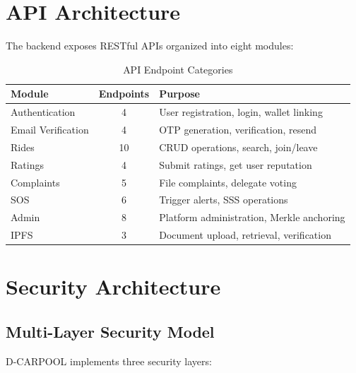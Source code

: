 \documentclass[12pt]{report}
\theoremstyle{plain}
\theoremstyle{definition}
\theoremstyle{remark}
\begin{document}
\section{API Architecture}

The backend exposes RESTful APIs organized into eight modules:

\begin{table}[H]
\centering
\caption{API Endpoint Categories}
\begin{tabular}{|l|c|l|}
\hline
\textbf{Module} & \textbf{Endpoints} & \textbf{Purpose} \\
\hline
Authentication & 4 & User registration, login, wallet linking \\
Email Verification & 4 & OTP generation, verification, resend \\
Rides & 10 & CRUD operations, search, join/leave \\
Ratings & 4 & Submit ratings, get user reputation \\
Complaints & 5 & File complaints, delegate voting \\
SOS & 6 & Trigger alerts, SSS operations \\
Admin & 8 & Platform administration, Merkle anchoring \\
IPFS & 3 & Document upload, retrieval, verification \\
\hline
\end{tabular}
\end{table}

\section{Security Architecture}

\subsection{Multi-Layer Security Model}

D-CARPOOL implements three security layers:
\end{document}
